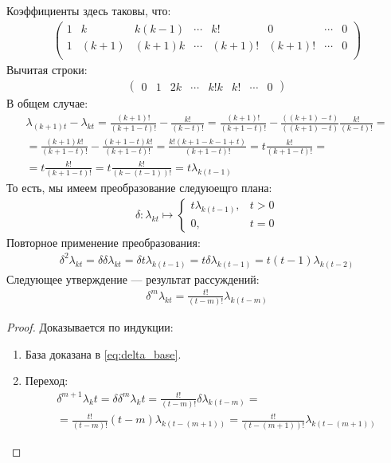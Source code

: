 Коэффициенты здесь таковы, что:
\begin{align}
	\begin{pmatrix}
		1 & k     & k(k-1) & \cdots & k!     & 0      & \cdots & 0 \\
		1 & (k+1) & (k+1)k & \cdots & (k+1)! & (k+1)! & \cdots & 0 \\
	\end{pmatrix}
\end{align}
Вычитая строки:
\begin{align}
	\begin{pmatrix}
		0 & 1 & 2k & \cdots & k!k & k! & \cdots & 0
	\end{pmatrix}
\end{align}
В общем случае:
\begin{multline}\label{eq:delta_base}
	\lambda_{(k+1)t} - \lambda_{kt} = \frac{(k+1)!}{(k+1-t)!} - \frac{k!}{(k-t)!} = \frac{(k+1)!}{(k+1-t)!} - \frac{((k+1)-t)}{((k+1)-t)}\frac{k!}{(k-t)!} = \\
	= \frac{(k+1)k!}{(k+1-t)!} - \frac{(k+1-t)k!}{(k+1-t)!} = \frac{k!(k+1-k-1+t)}{(k+1-t)!} = t \frac{k!}{(k + 1 - t)!} = \\
	= t \frac{k!}{(k + 1 - t)!} = t \frac{k!}{(k-(t-1))!} = t \lambda_{k(t-1)}
\end{multline}
То есть, мы имеем преобразование следуюещго плана:
\begin{align}
	\delta\colon \lambda_{kt} \mapsto
	\begin{cases}
		t \lambda_{k(t-1)}, & t > 0 \\
		0,                  & t=0
	\end{cases}
\end{align}
Повторное применение преобразования:
\begin{align}
	\delta^2\lambda_{kt} = \delta \delta \lambda_{kt} = \delta t \lambda_{k(t-1)} = t \delta \lambda_{k(t-1)} = t(t-1)\lambda_{k(t-2)}
\end{align}
Следующее утверждение --- результат рассуждений:
\begin{align}
	\delta^m \lambda_{kt} = \frac{t!}{(t-m)!} \lambda_{k(t-m)}
\end{align}
\begin{proof}
	Доказывается по индукции:
	\begin{enumerate}
		\item База доказана в \cref{eq:delta_base}.
		\item Переход:
		      \begin{multline}
			      \delta^{m+1}\lambda_kt = \delta \delta^{m} \lambda_kt = \frac{t!}{(t-m)!}\delta \lambda_{k(t-m)} = \\
			      = \frac{t!}{(t-m)!} (t-m) \lambda_{k(t-(m+1))} = \frac{t!}{(t-(m+1))!}\lambda_{k(t-(m+1))}
		      \end{multline}
	\end{enumerate}
\end{proof}
